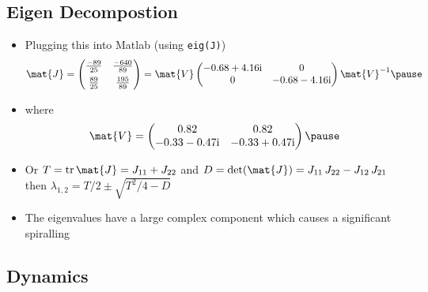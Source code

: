 \newcommand{\ii}{\mathrm{i}}

\begin{slide}
\section[-2]{Eigen Decompostion}

\begin{PauseHighLight}
  \begin{itemize}
  \item Plugging this into Matlab (using \texttt{eig(J)})
    {\small \begin{align*}
      \mat{J} =
      \begin{pmatrix}
        \frac{-89}{25} & \frac{-640}{89}\\
        \rule{0pt}{3ex} \frac{89}{25} & \frac{195}{89}
      \end{pmatrix}
      = \mat{V}
      \begin{pmatrix}
        -0.68 + 4.16\ii & 0 \\
        0  &  -0.68 - 4.16\ii
      \end{pmatrix}
      \mat{V}^{-1}\pause
    \end{align*}}
   \item where
     \begin{align*}
       \mat{V} = \begin{pmatrix}
        0.82 &   0.82 \\
        -0.33 - 0.47\ii  & -0.33 + 0.47\ii 
      \end{pmatrix} \pause                     
     \end{align*}
   \item Or $T = \mathop{\mathrm{tr}} \mat{J} = J_{11} + J_{22}$ and $D=
     \det(\mat{J})=J_{11}\,J_{22}-J_{12}\,J_{21}$ then $\lambda_{1,2} =
     T/2 \pm \sqrt{T^{2}/4-D}$\pause
   \item The eigenvalues have a large complex component which causes a
     significant spiralling\pause
  \end{itemize}
\end{PauseHighLight}

\end{slide}


\begin{slide}
\section[-2]{Dynamics}

\pause
\pb {}
\begin{center}
  \pause
\end{center}
\end{slide}




